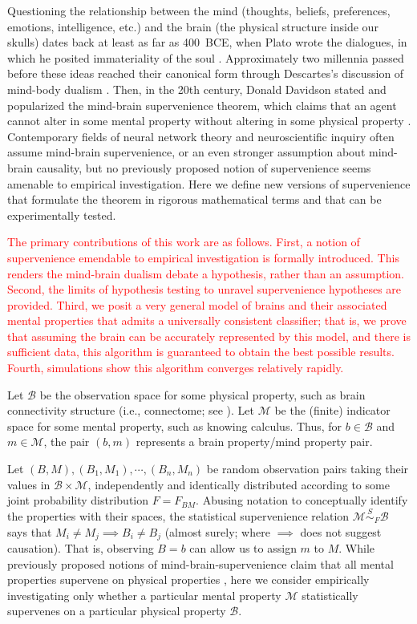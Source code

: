 \documentclass{article}
\newcommand{\mB}{\mathcal{B}}
\newcommand{\mM}{\mathcal{M}}
\providecommand{\tr}[1]{\textcolor{red}{#1}}
\begin{document}
Questioning the relationship between the mind (thoughts, beliefs, preferences, emotions, intelligence, etc.) and the brain (the physical structure inside our skulls) dates back at least as far as 400~BCE, when Plato wrote the dialogues, in which he posited immateriality of the soul \cite{Plato97}. Approximately two millennia passed before these ideas reached their canonical form through Descartes's discussion of mind-body dualism \cite{Descartes1641}. Then, in the 20th century, Donald Davidson stated and popularized the mind-brain supervenience theorem, which claims that an agent cannot alter in some mental property without altering in some physical property \cite{Davidson70}. Contemporary fields of neural network theory and neuroscientific inquiry often assume mind-brain supervenience, or an even stronger assumption about mind-brain causality, but no previously proposed notion of supervenience seems amenable to empirical investigation. Here we define new versions of supervenience that formulate the theorem in rigorous mathematical terms and that can be experimentally tested.

\tr{The primary contributions of this work are as follows.  First, a notion of supervenience emendable to empirical investigation is formally introduced.  This renders the mind-brain dualism debate a hypothesis, rather than an assumption.  Second, the limits of hypothesis testing to unravel supervenience hypotheses are provided.  Third, we posit a very general model of brains and their associated mental properties that admits a universally consistent classifier; that is, we prove that assuming the brain can be accurately represented by this model, and there is sufficient data, this algorithm is guaranteed to obtain the best possible results.  Fourth, simulations show this algorithm converges relatively rapidly.}

Let $\mB$ be the observation space for some physical property, such as brain connectivity structure (i.e., connectome; see \cite{SpornsKotter05,LichtmanSanes08,Seung09}). Let $\mM$ be the (finite) indicator space for some mental property, such as knowing calculus. Thus, for $b \in \mB$ and $m \in \mM$, the pair $(b,m)$ represents a brain property/mind property pair.

Let $(B,M), (B_1,M_1),\cdots,(B_n,M_n)$ be random observation pairs taking their values in $\mB \times \mM$, independently and identically distributed according to some joint probability distribution $F=F_{BM}$. Abusing notation to conceptually identify the properties with their spaces, the statistical supervenience relation $\mM \overset{S}{\sim}_F \mB$ says that $M_i \neq M_j \implies B_i \neq B_j$ (almost surely; where $\implies$ does not suggest causation). That is, observing $B=b$ can allow us to assign $m$ to $M$. While previously proposed notions of mind-brain-supervenience claim that all mental properties supervene on physical properties \cite{Kim95}, here we consider empirically investigating only whether a particular mental property $\mM$ statistically supervenes on a particular physical property $\mB$.
\end{document}
